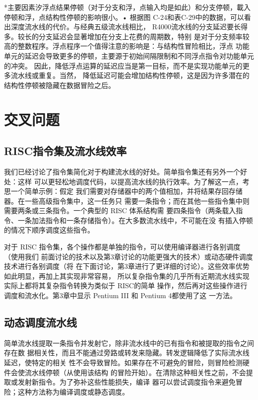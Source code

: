 *主要因素汐浮点结果停顿（对于分支和浮，点输入均是如此）和分支停顿，載入停顿和浮，点结构性停顿的影响很小。•
根据图 C-24和表C-29中的数据，可以看出深度流水线的代价。与经典五级流水线相比，
R4000流水线的分支延迟要长得多。较长的分支延迟会显著增加在分支上花费的周期数，特别
是对于分支频率较高的整数程序。浮点程序一个值得注意的影响是：与结构性冒险相比，浮点
功能单元的延迟会导致更多的停顿，主要源于初始间隔限制和不同浮点指令对功能单元的冲突。
因此，降低浮点运算的延迟应当是第一目标，而不是实现功能单元的更多流水线或重复。当然，
降低延迟可能会增加结构性停顿，这是因为许多潜在的结构性停顿被隐藏在数据冒险之后。

\section{交叉问题}
\subsection{RISC指令集及流水线效率}
我们已经讨论了指令集简化对于构建流水线的好处。简单指令集还有另外一个好处：这样
可以更轻松地调度代码，以提高流水线的执行效率。为了解这一点，考思一个简单示例：假定
我们需要对存储器中的两个值相加，并将结果存回存储器。在一些高级指令集中，这一任务只
需要一条指令；而在其他一些指令集中则需要两条或三条指令。一个典型的 RISC 体系结构需
要四条指令（两条载入指令、一条加法指令和一条存储指令）。在大多数流水线中，不可能在没
有插入停顿的情况下顺序调度这些指令。

对于 RISC 指令集，各个操作都是单独的指令，可以使用编译器进行各别调度（使用我们
前面讨论的技术以及第3章讨论的功能更强大的技术）或动态硬件调度技术进行各别调度（将
在下面讨论，第3章进行了更详细的讨论）。这些效率优势如此明显，再加上其实现非常容易，
所以复杂指令集的几乎所有近期流水线实现实际上都将其复杂指令转换为类似于 RISC的简单
操作，然后再对这些操作进行调度和流水化。第3章中显示 Pentium III 和 Pentium 4都使用了这
一方法。

\subsection{动态调度流水线}

简单流水线提取一条指令并发射它，除非流水线中的已有指令和被提取的指令之间存在数
据相关性，而且不能通过旁路或转发来隐藏。转发逻辑降低了实际流水线延迟，使特定的相关
性不会导致冒险。如果存在不可避免的冒险，则冒险检测硬件会使流水线停顿（从使用该结构
的冒险开始）。在清除这种相关性之前，不会提取或发射新指令。为了弥补这些性能损失，编译
器可以尝试调度指令来避免冒险；这种方法称为编译调度或静态调度。

